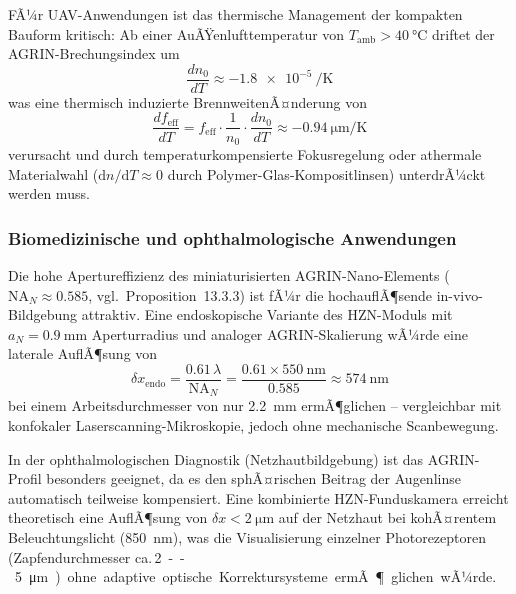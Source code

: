 ﻿\documentclass[12pt,a4paper]{article}
\theoremstyle{definition}
\newcommand{\eff}{\mathrm{eff}}
\begin{document}
	FÃ¼r UAV-Anwendungen ist das thermische Management der
	kompakten Bauform kritisch: Ab einer AuÃŸenlufttemperatur von
	$T_\mathrm{amb} > \SI{40}{\degreeCelsius}$ driftet der
	AGRIN-Brechungsindex um
	\begin{equation}
		\frac{dn_0}{dT} \approx \SI{-1.8e-5}{\per\kelvin}
		\label{eq:dn_dt}
	\end{equation}
	was eine thermisch induzierte BrennweitenÃ¤nderung von
	\begin{equation}
		\frac{df_\eff}{dT}
		= f_\eff\cdot\frac{1}{n_0}\cdot\frac{dn_0}{dT}
		\approx -\SI{0.94}{\micro\metre\per\kelvin}
		\label{eq:df_dt}
	\end{equation}
	verursacht und durch temperaturkompensierte Fokusregelung
	oder athermale Materialwahl ($\mathrm{d}n/\mathrm{d}T \approx 0$
	durch Polymer-Glas-Kompositlinsen) unterdrÃ¼ckt werden muss.

	\subsubsection{Biomedizinische und ophthalmologische Anwendungen}

	Die hohe Apertureffizienz des miniaturisierten AGRIN-Nano-Elements
	($\mathrm{NA}_N \approx 0.585$, vgl.\ Proposition~13.3.3) ist
	fÃ¼r die hochauflÃ¶sende in-vivo-Bildgebung attraktiv.  Eine
	endoskopische Variante des HZN-Moduls mit $a_N = \SI{0.9}{\milli\metre}$
	Aperturradius und analoger AGRIN-Skalierung wÃ¼rde eine laterale
	AuflÃ¶sung von
	\begin{equation}
		\delta x_\mathrm{endo}
		= \frac{0.61\,\lambda}{\mathrm{NA}_N}
		= \frac{0.61\times\SI{550}{\nano\metre}}{0.585}
		\approx \SI{574}{\nano\metre}
		\label{eq:endo_res}
	\end{equation}
	bei einem Arbeitsdurchmesser von nur \SI{2.2}{\milli\metre}
	ermÃ¶glichen -- vergleichbar mit konfokaler Laserscanning-Mikroskopie,
	jedoch ohne mechanische Scanbewegung.

	In der ophthalmologischen Diagnostik (Netzhautbildgebung) ist
	das AGRIN-Profil besonders geeignet, da es den sphÃ¤rischen Beitrag
	der Augenlinse automatisch teilweise kompensiert.  Eine kombinierte
	HZN-Funduskamera erreicht theoretisch eine AuflÃ¶sung von
	$\delta x < \SI{2}{\micro\metre}$ auf der Netzhaut bei kohÃ¤rentem
	Beleuchtungslicht (\SI{850}{\nano\metre}), was die Visualisierung
	einzelner Photorezeptoren (Zapfendurchmesser ca.\,\SI{2}--\SI{5}{\micro\metre})
	ohne adaptive optische Korrektursysteme ermÃ¶glichen wÃ¼rde.
\end{document}

